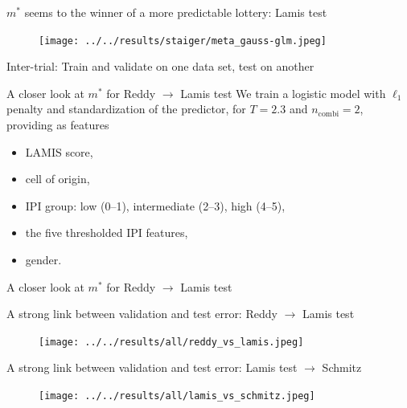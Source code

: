 \documentclass[10pt, aspectratio=169]{beamer}
\begin{document}
\begin{frame}{$m^*$ seems to the winner of a more predictable lottery: Lamis test}
  \begin{figure}[h]
    \centering
    \texttt{[image: ../../results/staiger/meta\_gauss-glm.jpeg]}
  \end{figure}
\end{frame}

\begin{frame}{Inter-trial: Train and validate on one data set, test on another}
  
\end{frame}

\begin{frame}{A closer look at $m^*$ for Reddy $\to$ Lamis test}
  We train a logistic model with $\ell_1$ penalty and standardization of 
  the predictor, for $T = \num{2.3}$ and 
  $n_\text{combi} = 2$, providing as features
  \begin{itemize}
    \item LAMIS score,
    \item cell of origin,
    \item IPI group: low (0--1), intermediate (2--3), high (4--5),
    \item the five thresholded IPI features,
    \item gender.
  \end{itemize}
\end{frame}

\begin{frame}{A closer look at $m^*$ for Reddy $\to$ Lamis test}
  
\end{frame}

\begin{frame}{A strong link between validation and test error: Reddy $\to$ Lamis test}
  \begin{figure}[h]
    \centering
    \texttt{[image: ../../results/all/reddy\_vs\_lamis.jpeg]}
  \end{figure}
\end{frame}

\begin{frame}{A strong link between validation and test error: Lamis test $\to$ Schmitz}
  \begin{figure}[h]
    \centering
    \texttt{[image: ../../results/all/lamis\_vs\_schmitz.jpeg]}
  \end{figure}
\end{frame}
\end{document}

